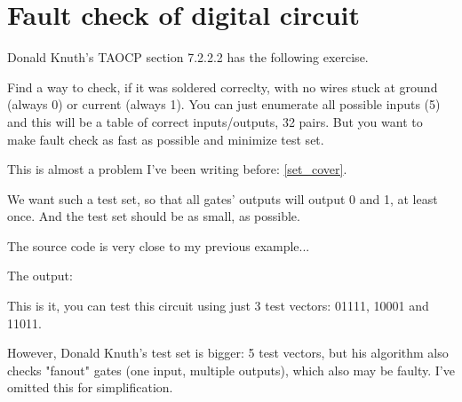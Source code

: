 \section{Fault check of digital circuit}

\renewcommand{\CURPATH}{MaxSMT/fault_check}

Donald Knuth's TAOCP section 7.2.2.2 has the following exercise.

\begin{figure}[H]
\centering
{}
\end{figure}

Find a way to check, if it was soldered correclty, with no wires stuck at ground (always 0) or current (always 1).
You can just enumerate all possible inputs (5) and this will be a table of correct inputs/outputs, 32 pairs.
But you want to make fault check as fast as possible and minimize test set.

This is almost a problem I've been writing before: \ref{set_cover}.

We want such a test set, so that all gates' outputs will output 0 and 1, at least once.
And the test set should be as small, as possible.

The source code is very close to my previous example...



The output:



This is it, you can test this circuit using just 3 test vectors: 01111, 10001 and 11011.

However, Donald Knuth's test set is bigger: 5 test vectors, but his algorithm also checks "fanout" gates (one input, multiple outputs), which also may be faulty.
I've omitted this for simplification.

